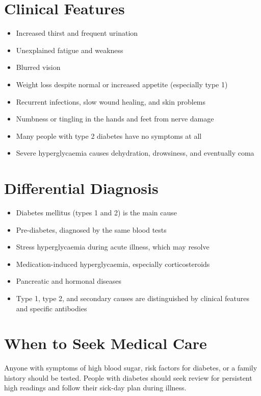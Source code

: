\section*{Clinical Features}
\begin{itemize}
    \item Increased thirst and frequent urination
    \item Unexplained fatigue and weakness
    \item Blurred vision
    \item Weight loss despite normal or increased appetite (especially type 1)
    \item Recurrent infections, slow wound healing, and skin problems
    \item Numbness or tingling in the hands and feet from nerve damage
    \item Many people with type 2 diabetes have no symptoms at all
    \item Severe hyperglycaemia causes dehydration, drowsiness, and eventually coma
\end{itemize}

\section*{Differential Diagnosis}
\begin{itemize}
    \item Diabetes mellitus (types 1 and 2) is the main cause
    \item Pre-diabetes, diagnosed by the same blood tests
    \item Stress hyperglycaemia during acute illness, which may resolve
    \item Medication-induced hyperglycaemia, especially corticosteroids
    \item Pancreatic and hormonal diseases
    \item Type 1, type 2, and secondary causes are distinguished by clinical features and specific antibodies
\end{itemize}

\section*{When to Seek Medical Care}
Anyone with symptoms of high blood sugar, risk factors for diabetes, or a family history should be tested. People with diabetes should seek review for persistent high readings and follow their sick-day plan during illness.

